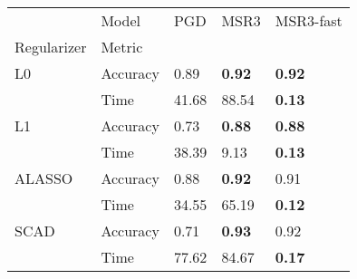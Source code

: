 \begin{tabular}{lllll}
\toprule
     & Model &    PGD &    MSR3 & MSR3-fast \\
Regularizer & Metric &        &        &       \\
\midrule
L0 & Accuracy &   0.89 &   \textbf{0.92} &  \textbf{0.92} \\
     & Time &  41.68 &  88.54 &  \textbf{0.13} \\
L1 & Accuracy &   0.73 &   \textbf{0.88} &  \textbf{0.88} \\
     & Time &  38.39 &   9.13 &  \textbf{0.13} \\
ALASSO & Accuracy &   0.88 &   \textbf{0.92} &  0.91 \\
     & Time &  34.55 &  65.19 &  \textbf{0.12} \\
SCAD & Accuracy &   0.71 &   \textbf{0.93} &  0.92 \\
     & Time &  77.62 &  84.67 &  \textbf{0.17} \\
\bottomrule
\end{tabular}
